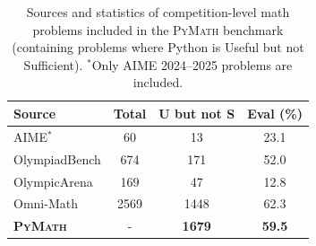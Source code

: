 \documentclass[11pt]{article}
\def \dataset{\textsc{PyMath}\xspace}
\newcommand{\postspace}{\vskip -3mm}
\begin{document}

\begin{table}[t]
\centering
\small
\begin{tabular}{lccc}
\toprule
\textbf{Source} & \textbf{Total} & \textbf{U but not S} & \textbf{Eval (\%)} \\
\midrule
AIME$^{*}$& 60 & 13 &  23.1\\
OlympiadBench& 674 & 171 &  52.0\\
OlympicArena& 169 & 47 &  12.8\\
Omni-Math& 2569 & 1448 &  62.3 \\
\rowcolor{green!10}
\textbf{\dataset} & - & \textbf{1679} &  \textbf{59.5}\\
\bottomrule
\end{tabular}
\caption{Sources and statistics of competition-level math problems included in the \dataset{} benchmark (containing problems where Python is Useful but not Sufficient). $^*$Only AIME 2024–2025 problems are included.}
\label{tab:data_sources_and_stats}
\postspace
\end{table}
\end{document}
